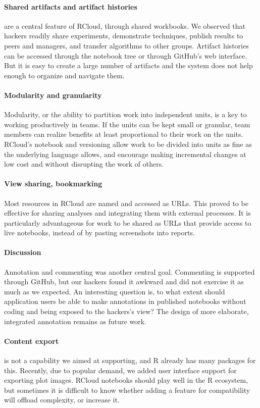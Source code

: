 \paragraph*{Shared artifacts and artifact histories} are a central feature
of RCloud, through shared workbooks. We observed that hackers readily
share experiments, demonstrate techniques, publish results to peers and
managers, and transfer algorithms to other groups. Artifact histories
can be accessed through the notebook tree or through GitHub's web interface.
But it is easy to create a large number of artifacts
and the system does not help enough to organize and navigate them.

\paragraph*{Modularity and granularity} Modularity, or the ability
to partition work into independent units, is a key to working
productively in teams.
If the units can be kept small or granular, team members
can realize benefits at least proportional to their work on the units.
RCloud's notebook and versioning allow work to be divided
into units as fine as the underlying language allows, and
encourage making incremental changes at low cost and without disrupting
the work of others.

\paragraph*{View sharing, bookmarking} Most resources in RCloud are named
and accessed as URLs. This proved to be effective for sharing analyses
and integrating them with external processes.  It is particularly
advantageous for work to be shared as URLs that provide access to live
notebooks, instead of by pasting screenshots into reports.

\paragraph*{Discussion} Annotation and commenting was another central goal.
Commenting is supported through GitHub, but our hackers found it
awkward and did not exercise it as much as we expected.
An interesting question is, to what extent should application users
be able to make annotations in published notebooks without coding
and being exposed to the hackers's view? The design of
more elaborate, integrated annotation remains as future work.

\paragraph*{Content export} is not a capability we aimed at supporting,
and R already has many packages for this. Recently, due to popular
demand, we added user interface support for exporting plot images.
RCloud notebooks should play well in the R ecosystem,
but sometimes it is difficult to know whether adding
a feature for compatibility will offload complexity, or increase it.

